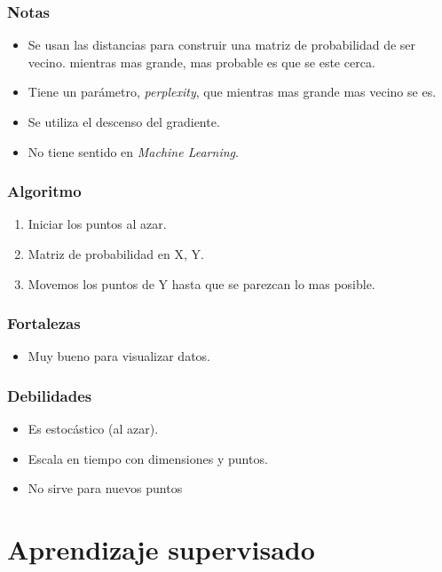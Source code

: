 \documentclass[titlepage,a4paper]{article}
\begin{document}
\subsubsection*{Notas}
\begin{itemize}
    \item Se usan las distancias para construir una matriz de probabilidad de ser vecino. mientras mas grande, mas probable es que se este cerca.

    \item Tiene un parámetro, \textit{perplexity}, que mientras mas grande mas vecino se es.
    
    \item Se utiliza el descenso del gradiente.
    
    \item No tiene sentido en \textit{Machine Learning}.
\end{itemize}

\subsubsection*{Algoritmo}
\begin{enumerate}
    \item Iniciar los puntos al azar.
    \item Matriz de probabilidad en X, Y.
    \item Movemos los puntos de Y hasta que se parezcan lo mas posible.
\end{enumerate}

\subsubsection*{Fortalezas}
\begin{itemize}
    \item Muy bueno para visualizar datos.
\end{itemize}

\subsubsection*{Debilidades}
\begin{itemize}
    \item Es estocástico (al azar).
    \item Escala en tiempo con dimensiones y puntos.
    \item No sirve para nuevos puntos
\end{itemize}

\section{Aprendizaje supervisado}
\end{document}
